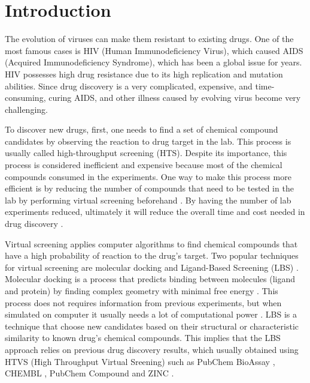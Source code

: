 \documentclass[conference]{IEEEtran}
\begin{document}
\IEEEpeerreviewmaketitle

\section{Introduction}

The evolution of viruses can make them resistant to existing drugs. One of the most famous cases is HIV (Human Immunodeficiency Virus), which caused AIDS (Acquired Immunodeficiency Syndrome), which has been a global issue for years. HIV possesses high drug resistance due to its high replication and mutation abilities. Since drug discovery is a very complicated, expensive, and time-consuming, curing AIDS, and other illness caused by evolving virus become very challenging\cite{yanuar2014virtual}.

To discover new drugs, first, one needs to find a set of chemical compound candidates by observing the reaction to drug target in the lab. This process is usually called high-throughput screening (HTS). Despite its importance, this process is considered inefficient and expensive because most of the chemical compounds consumed in the experiments. One way to make this process more efficient is by reducing the number of compounds that need to be tested in the lab by performing virtual screening beforehand \cite{chen2017developing}. By having the number of lab experiments reduced, ultimately it will reduce the overall time and cost needed in drug discovery \cite{korkmaz2014drug}.

Virtual screening applies computer algorithms to find chemical compounds that have a high probability of reaction to the drug's target. Two popular techniques for virtual screening are molecular docking and Ligand-Based Screening (LBS) \cite{chen2017developing}. Molecular docking is a process that predicts binding between molecules (ligand and protein) by finding complex geometry with minimal free energy \cite{sotriffer2000automated}. This process does not requires information from previous experiments, but when simulated on computer it usually needs a lot of computational power \cite{chen2017developing}. LBS is a technique that choose new candidates based on their structural or characteristic similarity to known drug's chemical compounds. This implies that the LBS approach relies on previous drug discovery results, which usually obtained using HTVS (High Throughput Virtual Sreening) such as PubChem BioAssay \cite{bioassay2014update}, CHEMBL \cite{bento2014chembl}, PubChem Compound \cite{kim2015pubchem} and ZINC \cite{irwin2012zinc}.
\end{document}
